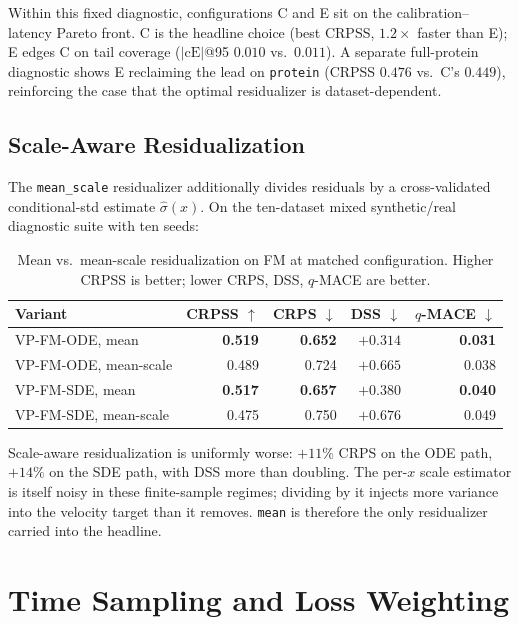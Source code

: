 \documentclass{article}
\begin{document}
Within this fixed diagnostic, configurations C and E sit on the calibration--latency Pareto front. C is the headline choice (best CRPSS, $1.2\times$ faster than E); E edges C on tail coverage ($|\text{cE}|$@95 $0.010$ vs.\ $0.011$). A separate full-protein diagnostic shows E reclaiming the lead on \texttt{protein} (CRPSS $0.476$ vs.\ C's $0.449$), reinforcing the case that the optimal residualizer is dataset-dependent.

\subsection{Scale-Aware Residualization}\label{app:mean-scale}

The \texttt{mean\_scale} residualizer additionally divides residuals by a cross-validated conditional-std estimate $\hat\sigma(x)$. On the ten-dataset mixed synthetic/real diagnostic suite with ten seeds:

\begin{table}[!h]
  \centering
  \caption{Mean vs.\ mean-scale residualization on FM at matched configuration. Higher CRPSS is better; lower CRPS, DSS, $q$-MACE are better.}\label{tab:mean-scale}
  \footnotesize
  \begin{tabular}{lrrrr}
    \toprule
    Variant & CRPSS $\uparrow$ & CRPS $\downarrow$ & DSS $\downarrow$ & $q$-MACE $\downarrow$ \\
    \midrule
    VP-FM-ODE, mean       & \textbf{0.519} & \textbf{0.652} & \textbf{$+0.314$} & \textbf{0.031} \\
    VP-FM-ODE, mean-scale & 0.489 & 0.724 & $+0.665$ & 0.038 \\
    VP-FM-SDE, mean       & \textbf{0.517} & \textbf{0.657} & \textbf{$+0.380$} & \textbf{0.040} \\
    VP-FM-SDE, mean-scale & 0.475 & 0.750 & $+0.676$ & 0.049 \\
    \bottomrule
  \end{tabular}
\end{table}

Scale-aware residualization is uniformly worse: $+11\%$ CRPS on the ODE path, $+14\%$ on the SDE path, with DSS more than doubling. The per-$x$ scale estimator is itself noisy in these finite-sample regimes; dividing by it injects more variance into the velocity target than it removes. \texttt{mean} is therefore the only residualizer carried into the headline.

\section{Time Sampling and Loss Weighting}\label{app:t-and-loss}
\end{document}
